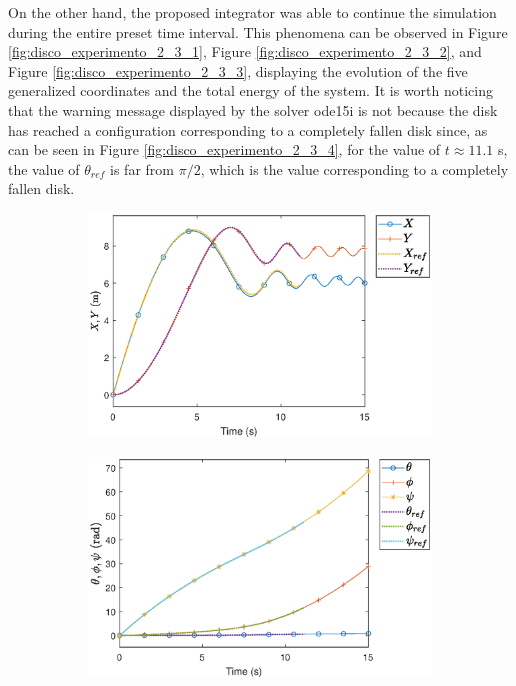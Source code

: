 \documentclass{aims}
\numberwithin{equation}{section}
\theoremstyle{definition}
\begin{document}
On the other hand, the proposed integrator was able to continue the simulation during the entire preset time interval. This phenomena can be observed in Figure \ref{fig:disco_experimento_2_3_1}, Figure \ref{fig:disco_experimento_2_3_2}, and Figure \ref{fig:disco_experimento_2_3_3}, displaying the evolution of the five generalized coordinates and the total energy of the system. It is worth noticing that the warning message displayed by the solver ode15i is not because the disk has reached a configuration corresponding to a completely fallen disk since, as can be seen in Figure \ref{fig:disco_experimento_2_3_4}, for the value of $t\approx 11.1$ s, the value of $\theta_{ref}$ is far from $\pi/2$, which is the value corresponding to a completely fallen disk.

\begin{figure}
  \centering
  \begin{subfigure}[b]{0.75\textwidth}
    \centering
    \includegraphics[width=\textwidth]{fig/23XY.eps}
  \end{subfigure}
  \par\bigskip
  \begin{subfigure}[b]{0.75\textwidth}
    \centering
    \includegraphics[width=\textwidth]{fig/23thetaphipsi.eps}

\end{subfigure}
\end{figure}
\end{document}

